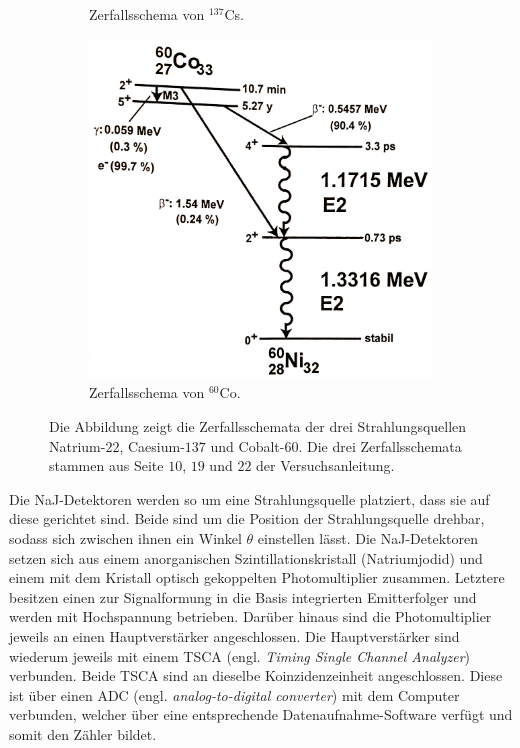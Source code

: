 \begin{figure}[H]
\begin{subfigure}[t]{0.45\textwidth}
		\caption{Zerfallsschema von $^{137}$Cs.}
	\end{subfigure}
	\begin{subfigure}[t]{0.45\textwidth}
		\centering
		\includegraphics[width=\textwidth]{img/ZerfallsschemaVonCo60}
		\caption{Zerfallsschema von $^{60}$Co.}
	\end{subfigure}
	\caption{Die Abbildung zeigt die Zerfallsschemata der drei Strahlungsquellen Natrium-$22$, Caesium-$137$ und Cobalt-$60$. Die drei Zerfallsschemata stammen aus Seite $10$, $19$ und $22$ der Versuchsanleitung\cite{wwu}.}
	\label{Zerfallsschemata}
\end{figure}
\noindent Die NaJ-Detektoren werden so um eine Strahlungsquelle platziert, dass sie auf diese gerichtet sind.
Beide sind um die Position der Strahlungsquelle drehbar, sodass sich zwischen ihnen ein Winkel $\theta$ einstellen lässt.
Die NaJ-Detektoren setzen sich aus einem anorganischen Szintillationskristall (Natriumjodid) und einem mit dem Kristall optisch gekoppelten Photomultiplier zusammen.
Letztere besitzen einen zur Signalformung in die Basis integrierten Emitterfolger und werden mit Hochspannung betrieben.
Darüber hinaus sind die Photomultiplier jeweils an einen Hauptverstärker angeschlossen.
Die Hauptverstärker sind wiederum jeweils mit einem TSCA (engl. \emph{Timing Single Channel Analyzer}) verbunden.
Beide TSCA sind an dieselbe Koinzidenzeinheit angeschlossen.
Diese ist über einen ADC (engl. \emph{analog-to-digital converter}) mit dem Computer verbunden, welcher über eine entsprechende Datenaufnahme-Software verfügt und somit den Zähler bildet.

